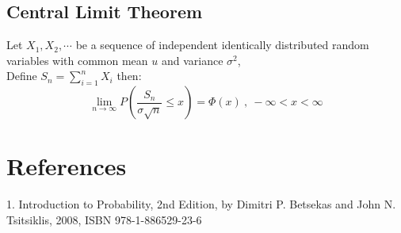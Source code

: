\documentclass[11pt]{article}
\begin{document}
\subsection{Central Limit Theorem}
Let \textbf{$X_1 , X_2 , \cdots$} be a sequence of independent identically distributed random variables with common mean $u$ and variance $\sigma^2$,\\
Define $S_n = \sum_{i=1}^{n}X_i$ then: \\
$$\lim_{n\to \infty} P\left(\frac{S_n}{\sigma\sqrt{n}} \leq x\right) = \Phi(x) \ , \ -\infty<x<\infty$$

\section{References}
1. Introduction to Probability, 2nd Edition, by Dimitri P. Betsekas and John N. Tsitsiklis, 2008, ISBN 978-1-886529-23-6
\end{document}
